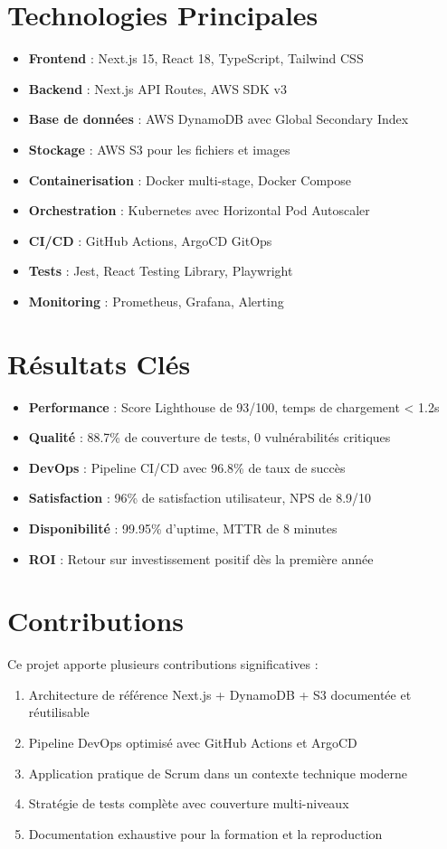 \documentclass[12pt,a4paper]{report}
\begin{document}
\section*{Technologies Principales}
\begin{itemize}
    \item \textbf{Frontend} : Next.js 15, React 18, TypeScript, Tailwind CSS
    \item \textbf{Backend} : Next.js API Routes, AWS SDK v3
    \item \textbf{Base de données} : AWS DynamoDB avec Global Secondary Index
    \item \textbf{Stockage} : AWS S3 pour les fichiers et images
    \item \textbf{Containerisation} : Docker multi-stage, Docker Compose
    \item \textbf{Orchestration} : Kubernetes avec Horizontal Pod Autoscaler
    \item \textbf{CI/CD} : GitHub Actions, ArgoCD GitOps
    \item \textbf{Tests} : Jest, React Testing Library, Playwright
    \item \textbf{Monitoring} : Prometheus, Grafana, Alerting
\end{itemize}

\section*{Résultats Clés}
\begin{itemize}
    \item \textbf{Performance} : Score Lighthouse de 93/100, temps de chargement < 1.2s
    \item \textbf{Qualité} : 88.7\% de couverture de tests, 0 vulnérabilités critiques
    \item \textbf{DevOps} : Pipeline CI/CD avec 96.8\% de taux de succès
    \item \textbf{Satisfaction} : 96\% de satisfaction utilisateur, NPS de 8.9/10
    \item \textbf{Disponibilité} : 99.95\% d'uptime, MTTR de 8 minutes
    \item \textbf{ROI} : Retour sur investissement positif dès la première année
\end{itemize}

\section*{Contributions}
Ce projet apporte plusieurs contributions significatives :
\begin{enumerate}
    \item Architecture de référence Next.js + DynamoDB + S3 documentée et réutilisable
    \item Pipeline DevOps optimisé avec GitHub Actions et ArgoCD
    \item Application pratique de Scrum dans un contexte technique moderne
    \item Stratégie de tests complète avec couverture multi-niveaux
    \item Documentation exhaustive pour la formation et la reproduction
\end{enumerate}
\end{document}
